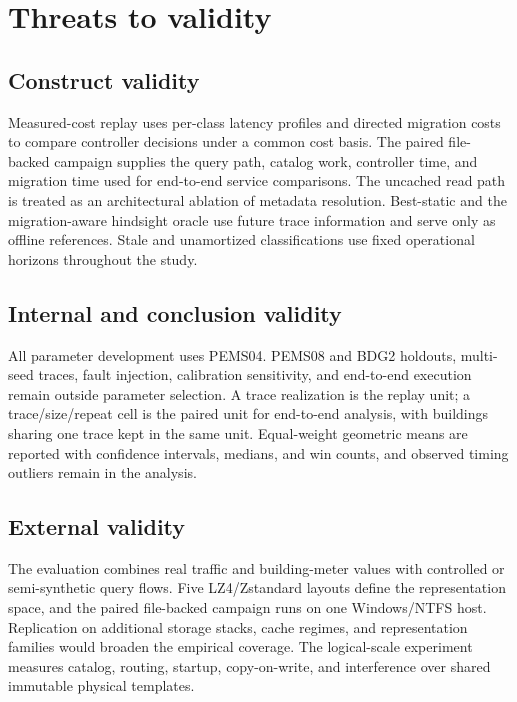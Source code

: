\documentclass[final,5p,times,twocolumn,authoryear]{elsarticle}
\begin{document}
\section{Threats to validity}
\label{sec:threats}

\subsection{Construct validity}

Measured-cost replay uses per-class latency profiles and directed migration costs to compare controller decisions under a common cost basis. The paired file-backed campaign supplies the query path, catalog work, controller time, and migration time used for end-to-end service comparisons. The uncached read path is treated as an architectural ablation of metadata resolution. Best-static and the migration-aware hindsight oracle use future trace information and serve only as offline references. Stale and unamortized classifications use fixed operational horizons throughout the study.

\subsection{Internal and conclusion validity}

All parameter development uses PEMS04. PEMS08 and BDG2 holdouts, multi-seed traces, fault injection, calibration sensitivity, and end-to-end execution remain outside parameter selection. A trace realization is the replay unit; a trace/size/repeat cell is the paired unit for end-to-end analysis, with buildings sharing one trace kept in the same unit. Equal-weight geometric means are reported with confidence intervals, medians, and win counts, and observed timing outliers remain in the analysis.

\subsection{External validity}

The evaluation combines real traffic and building-meter values with controlled or semi-synthetic query flows. Five LZ4/Zstandard layouts define the representation space, and the paired file-backed campaign runs on one Windows/NTFS host. Replication on additional storage stacks, cache regimes, and representation families would broaden the empirical coverage. The logical-scale experiment measures catalog, routing, startup, copy-on-write, and interference over shared immutable physical templates.
\end{document}
